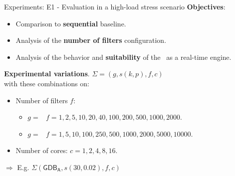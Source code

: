 \begin{frame}{Experiments: E1 - Evaluation in a high-load stress scenario}
\textbf{Objectives}:
\begin{itemize}
    \item Comparison to \textbf{sequential} baseline.
    \item Analysis of the \textbf{number of filters} configuration.
    \item Analysis of the behavior and \textbf{suitability} of the \DPATM\ as a real-time engine.
\end{itemize}
\vspace{0.5em}
\textbf{Experimental variations}. $\Sigma= (g, s(k, p), f, c)$\\
with these combinations on:
\vspace{0.3em}
\begin{itemize}
    \item Number of filters $f$:
    \begin{itemize}
        \item $g = $ \smallG\ $f=1,2,5,10,20,40,100,200,500,1000,2000$.
        \item $g = $ \mediumG\ $f=1,5,10,100,250,500,1000,2000,5000,10000$.
    \end{itemize} 
    \item Number of cores: $c = 1, 2, 4, 8, 16$.
\end{itemize}
\vspace{0.7em}
$\Rightarrow$ {\small E.g. $\Sigma(\mathsf{GDB_A}, s(30, 0.02), f, c)$}
\end{frame}

